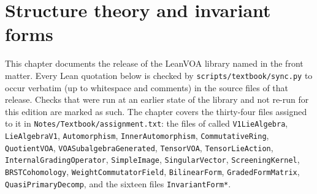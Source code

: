 \chapter{Structure theory and invariant forms}\label{ch:L04}
\begingroup\setlength{\emergencystretch}{3em}

\providecommand{\lfourvac}{\mathbf{1}}
\providecommand{\lfourV}{V}
\providecommand{\lfourm}{\mathfrak{m}}
\providecommand{\lfourrad}{\operatorname{rad}}
\providecommand{\lfourQP}{\mathcal{QP}}
\providecommand{\lfourvc}{\varepsilon}
\providecommand{\lfourH}{\mathrm{H}}

This chapter documents the release of the LeanVOA library named in the front matter. Every Lean quotation below is checked by \texttt{scripts/textbook/sync.py}
to occur verbatim (up to whitespace and comments) in the source files of that release. Checks that were run at an earlier state of the library and not re-run for this edition are marked as such. The chapter covers the thirty-four files assigned to it in
\texttt{Notes/Textbook/assignment.txt}: the files of  called
\texttt{V1LieAlgebra}, \texttt{LieAlgebraV1}, \texttt{Automorphism}, \texttt{InnerAutomorphism},
\texttt{CommutativeRing}, \texttt{QuotientVOA}, \texttt{VOASubalgebraGenerated}, \texttt{TensorVOA},
\texttt{TensorLieAction}, \texttt{InternalGradingOperator}, \texttt{SimpleImage},
\texttt{SingularVector}, \texttt{ScreeningKernel}, \texttt{BRSTCohomology},
\texttt{WeightCommutatorField}, \texttt{BilinearForm}, \texttt{GradedFormMatrix},
\texttt{QuasiPrimaryDecomp}, and the sixteen files \texttt{InvariantForm*}.

